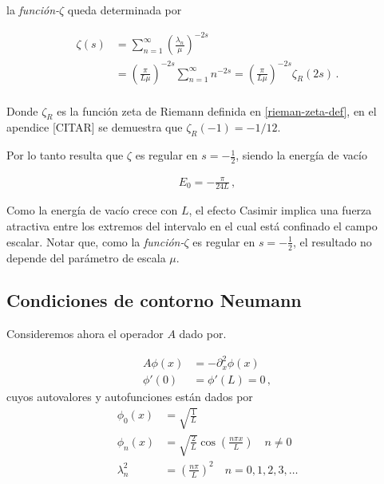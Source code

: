 la {\it función-$\zeta$} queda determinada por

\begin{equation}
\begin{aligned}
\zeta  (s) &= 
\sum _{n=1} ^{\infty} \left( \frac{\lambda _n }{\mu }  \right) ^{-2s}  \\[10pt]
&= \left(  \frac{\pi}{L \mu} \right) ^{-2s}   \sum _{n=1} ^{\infty} n ^{-2s} = 
\left( \frac{\pi}{L \mu} \right) ^{-2s}  \zeta _R (2s) \, . \\[10pt]
\end{aligned}
\end{equation}

Donde $\zeta _R$ es la función zeta de Riemann definida en \ref{rieman-zeta-def}, en el apendice [CITAR] se demuestra  que $\zeta _R (-1) = -1/12$. 

Por lo tanto resulta que $\zeta$ es regular en $s=-\frac{1}{2}$, siendo la energía de vacío

\begin{equation}\label{eq.energia.dirichlet}
\begin{array}{c}
E _0 = - \frac{\pi}{24 L} \, ,
\end{array}
\end{equation}


Como la energía de vacío crece con $L$, el efecto Casimir implica una fuerza
atractiva entre los extremos del intervalo en el cual está confinado el campo
escalar. Notar que, como la {\it función-$\zeta$} es regular en $s=-\frac{1}{2}$, el resultado no depende del parámetro de escala $\mu$.\\

\subsection*{Condiciones de contorno Neumann}


Consideremos ahora el operador $A$ dado por.

\begin{equation}
\begin{aligned}
	A \phi (x) &= - \partial _x ^2 \phi (x) \\[10pt]
    \phi ' (0) &= \phi ' (L) = 0 \, ,
\end{aligned}
\end{equation}
cuyos autovalores y autofunciones están dados por
\begin{equation}
\begin{aligned}
	\phi _0 (x) &= \sqrt{ \frac{1}{L} } \\[5pt]
	\phi _n (x)  &= \sqrt{\frac{2}{L}} \cos \left( \frac{n \pi x}{L} \right) 
	\, \, \, \, \, \, n \neq 0\\[5pt]
	\lambda ^2 _n  &= \left( \frac{n \pi }{L} \right) ^2 
	\, \, \, \, \, \,
	n = 0,1,2,3, \dots
	\\[5pt]
\end{aligned}
\end{equation}


